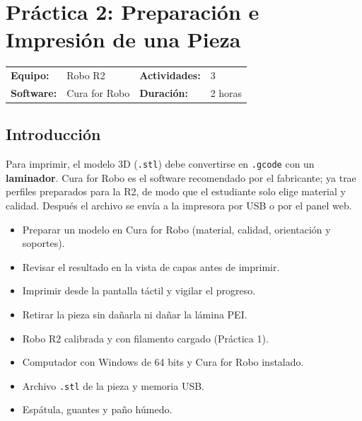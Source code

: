 \chapter{Práctica 2: Preparación e Impresión de una Pieza}

\begin{center}
  \small\renewcommand{\arraystretch}{1.3}
  \begin{tabular}{l l l l}
    \textbf{Equipo:}      & Robo R2   &
    \textbf{Actividades:} & 3 \\
    \textbf{Software:}    & Cura for Robo &
    \textbf{Duración:}    & 2 horas \\
  \end{tabular}
\end{center}

\section{Introducción}

Para imprimir, el modelo 3D (\texttt{.stl}) debe convertirse en \texttt{.gcode} con un \textbf{laminador}. Cura for Robo es el software recomendado por el fabricante; ya trae perfiles preparados para la R2, de modo que el estudiante solo elige material y calidad. Después el archivo se envía a la impresora por USB o por el panel web.

\begin{objetivebox}
\begin{itemize}
    \item Preparar un modelo en Cura for Robo (material, calidad, orientación y soportes).
    \item Revisar el resultado en la vista de capas antes de imprimir.
    \item Imprimir desde la pantalla táctil y vigilar el progreso.
    \item Retirar la pieza sin dañarla ni dañar la lámina PEI.
\end{itemize}
\end{objetivebox}

\vspace{6pt}

\begin{materialbox}
\begin{itemize}
    \item Robo R2 calibrada y con filamento cargado (Práctica 1).
    \item Computador con Windows de 64 bits y Cura for Robo instalado.
    \item Archivo \texttt{.stl} de la pieza y memoria USB.
    \item Espátula, guantes y paño húmedo.
\end{itemize}
\end{materialbox}

